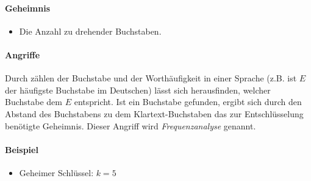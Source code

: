 				\paragraph{Geheimnis}
					\begin{itemize}
						\item Die Anzahl zu drehender Buchstaben.
					\end{itemize}

				\paragraph{Angriffe}
					Durch zählen der Buchstabe und der Worthäufigkeit in einer Sprache (z.B. ist \(E\) der häufigste Buchstabe im Deutschen) lässt sich herausfinden, welcher Buchstabe dem \(E\) entspricht. Ist ein Buchstabe gefunden, ergibt sich durch den Abstand des Buchstabens zu dem Klartext-Buchstaben das zur Entschlüsselung benötigte Geheimnis. Dieser Angriff wird \textit{Frequenzanalyse} genannt.

				\paragraph{Beispiel}
					\begin{itemize}
						\item Geheimer Schlüssel: \tabto{5cm} \( k = 5 \)
					\end{itemize}

